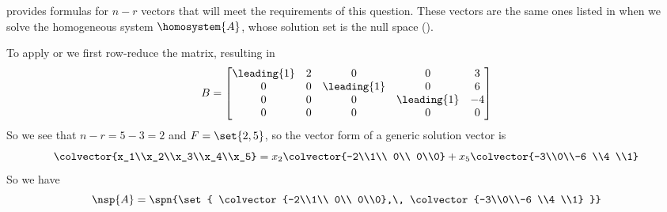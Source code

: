  provides formulas for $n-r$ vectors that will meet the requirements of this question.  These vectors are the same ones listed in  when we solve the homogeneous system $\homosystem{A}$, whose solution set is the null space ().\par
%
To apply  or  we first row-reduce the matrix, resulting in 
%
\begin{equation*}
B=
\begin{bmatrix}
 \leading{1} & 2 & 0 & 0 & 3 \\
 0 & 0 & \leading{1} & 0 & 6 \\
 0 & 0 & 0 & \leading{1} & -4 \\
 0 & 0 & 0 & 0 & 0
\end{bmatrix}
\end{equation*}
%
So we see that $n-r=5-3=2$ and $F=\set{2,5}$, so the vector form of a generic solution vector is
%
\begin{equation*}
\colvector{x_1\\x_2\\x_3\\x_4\\x_5}
=
x_2\colvector{-2\\1\\ 0\\ 0\\0}
+
x_5\colvector{-3\\0\\-6 \\4 \\1}
\end{equation*}
%
So we have
%
\begin{equation*}
\nsp{A}=\spn{\set{
\colvector{-2\\1\\ 0\\ 0\\0},\,
\colvector{-3\\0\\-6 \\4 \\1}
}}
\end{equation*}
%
